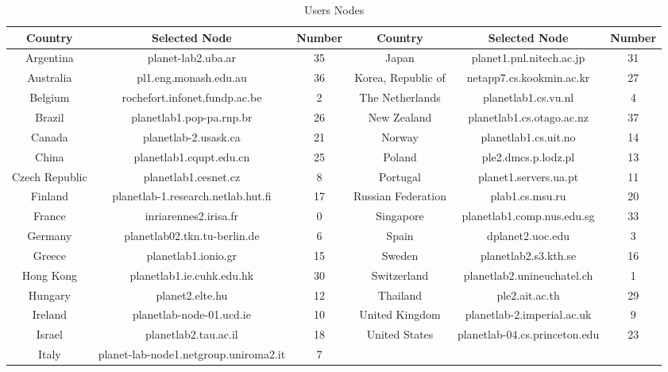 
\begin{table*} [tb]
\centering
\footnotesize%
\caption{Users Nodes}\label{table:Usersnodes}
\begin{tabular}{|c|c|c|c|c|c|}\hline
\textbf{Country} & \textbf{Selected Node} & \textbf{Number} &\textbf{Country} & \textbf{Selected Node} &\textbf{Number}\\\hline
       Argentina  & planet-lab2.uba.ar                 & 35  &   Japan & planet1.pnl.nitech.ac.jp                &  31 \\\hline
       Australia & pl1.eng.monash.edu.au               & 36  &   Korea, Republic of & netapp7.cs.kookmin.ac.kr   &  27 \\\hline
       Belgium & rochefort.infonet.fundp.ac.be         & 2  &   The Netherlands & planetlab1.cs.vu.nl          & 4   \\\hline
       Brazil & planetlab1.pop-pa.rnp.br               & 26  &   New Zealand & planetlab1.cs.otago.ac.nz         &  37 \\\hline
       Canada & planetlab-2.usask.ca                   & 21  &   Norway & planetlab1.cs.uit.no                   &  14 \\\hline
       China & planetlab1.cqupt.edu.cn                 & 25  &   Poland & ple2.dmcs.p.lodz.pl                    &  13 \\\hline
       Czech Republic & planetlab1.cesnet.cz           & 8  &   Portugal & planet1.servers.ua.pt                & 11  \\\hline
       Finland & planetlab-1.research.netlab.hut.fi    & 17  &   Russian Federation & plab1.cs.msu.ru            & 20  \\\hline
       France & inriarennes2.irisa.fr                  & 0  &   Singapore & planetlab1.comp.nus.edu.sg          &   33\\\hline
       Germany & planetlab02.tkn.tu-berlin.de          & 6  &   Spain & dplanet2.uoc.edu                        &  3 \\\hline
       Greece & planetlab1.ionio.gr                    & 15  &   Sweden & planetlab2.s3.kth.se                   & 16  \\\hline
       Hong Kong & planetlab1.ie.cuhk.edu.hk           & 30  &   Switzerland & planetlab2.unineuchatel.ch        &  1 \\\hline
       Hungary & planet2.elte.hu                       & 12  &   Thailand & ple2.ait.ac.th                       & 29  \\\hline
       Ireland & planetlab-node-01.ucd.ie              & 10 &   United Kingdom & planetlab-2.imperial.ac.uk     &  9 \\\hline
       Israel & planetlab2.tau.ac.il                   & 18  &   United States & planetlab-04.cs.princeton.edu   & 23  \\\hline
       Italy & planet-lab-node1.netgroup.uniroma2.it   & 7  &           &    &\\\hline
\end{tabular}
\end{table*}